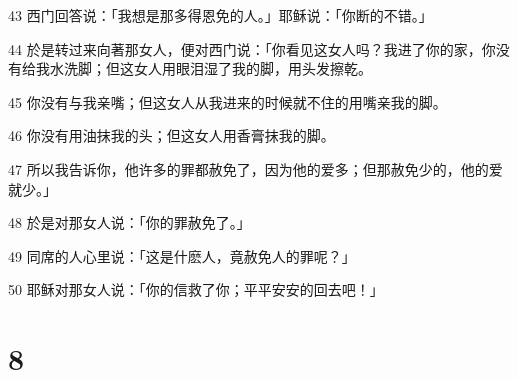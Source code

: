 \par 43 西门回答说：「我想是那多得恩免的人。」耶稣说：「你断的不错。」
\par 44 於是转过来向著那女人，便对西门说：「你看见这女人吗？我进了你的家，你没有给我水洗脚；但这女人用眼泪湿了我的脚，用头发擦乾。
\par 45 你没有与我亲嘴；但这女人从我进来的时候就不住的用嘴亲我的脚。
\par 46 你没有用油抹我的头；但这女人用香膏抹我的脚。
\par 47 所以我告诉你，他许多的罪都赦免了，因为他的爱多；但那赦免少的，他的爱就少。」
\par 48 於是对那女人说：「你的罪赦免了。」
\par 49 同席的人心里说：「这是什麽人，竟赦免人的罪呢？」
\par 50 耶稣对那女人说：「你的信救了你；平平安安的回去吧！」

\chapter{8}

